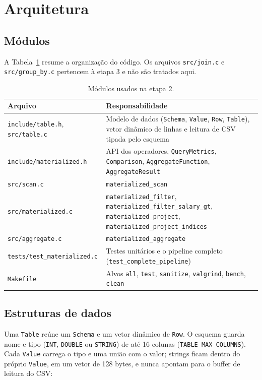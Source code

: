 \documentclass[11pt,a4paper]{article}
\begin{document}
\section{Arquitetura}

\subsection{Módulos}
A Tabela~\ref{tab:modulos} resume a organização do código. Os arquivos \texttt{src/join.c} e \texttt{src/group\_by.c} pertencem à etapa 3 e não são tratados aqui.

\begin{table}[H]
\centering
\small
\begin{tabular}{@{}p{5.3cm}p{11.1cm}@{}}
\toprule
Arquivo & Responsabilidade \\
\midrule
\texttt{include/table.h}, \texttt{src/table.c} & Modelo de dados (\texttt{Schema}, \texttt{Value}, \texttt{Row}, \texttt{Table}), vetor dinâmico de linhas e leitura de CSV tipada pelo esquema \\
\texttt{include/materialized.h} & API dos operadores, \texttt{QueryMetrics}, \texttt{Comparison}, \texttt{AggregateFunction}, \texttt{AggregateResult} \\
\texttt{src/scan.c} & \texttt{materialized\_scan} \\
\texttt{src/materialized.c} & \texttt{materialized\_filter}, \texttt{materialized\_filter\_salary\_gt}, \texttt{materialized\_project}, \texttt{materialized\_project\_indices} \\
\texttt{src/aggregate.c} & \texttt{materialized\_aggregate} \\
\texttt{tests/test\_materialized.c} & Testes unitários e o pipeline completo (\texttt{test\_complete\_pipeline}) \\
\texttt{Makefile} & Alvos \texttt{all}, \texttt{test}, \texttt{sanitize}, \texttt{valgrind}, \texttt{bench}, \texttt{clean} \\
\bottomrule
\end{tabular}
\caption{Módulos usados na etapa 2.}
\label{tab:modulos}
\end{table}

\subsection{Estruturas de dados}
Uma \texttt{Table} reúne um \texttt{Schema} e um vetor dinâmico de \texttt{Row}. O esquema guarda nome e tipo (\texttt{INT}, \texttt{DOUBLE} ou \texttt{STRING}) de até 16 colunas (\texttt{TABLE\_MAX\_COLUMNS}). Cada \texttt{Value} carrega o tipo e uma união com o valor; strings ficam dentro do próprio \texttt{Value}, em um vetor de 128 bytes, e nunca apontam para o buffer de leitura do CSV:
\end{document}
